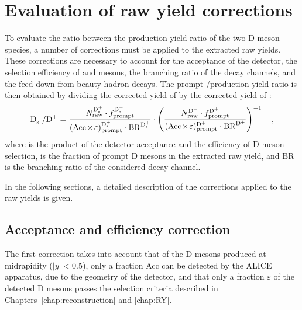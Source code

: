 \chapter{Evaluation of raw yield corrections}

To evaluate the ratio between the production yield ratio of the two D-meson species, a number of corrections must be applied to the extracted raw yields. These corrections are necessary to account for the acceptance of the detector, the selection efficiency of \ds and \dpl mesons, the branching ratio of the decay channels, and the feed-down from beauty-hadron decays. The prompt \ds/\dpl production yield ratio is then obtained by dividing the corrected yield of \ds by the corrected yield of \dpl:
\begin{equation}\label{eq:DsDplusRatio}
        \mathrm{D_s^+}/\mathrm{D^+} = \frac{N_\mathrm{raw}^{\mathrm{D_s^+}}\cdot f_\mathrm{prompt}^\mathrm{D_s^+}}{(\mathrm{Acc}\mkern-2mu\times\mkern-2mu\varepsilon)_\mathrm{prompt}^\mathrm{D_s^+} \cdot \mathrm{BR}^\mathrm{D_s^+}} \cdot \left(\frac{N_\mathrm{raw}^{\mathrm{D^+}}\cdot f_\mathrm{prompt}^\mathrm{D^+}}{(\mathrm{Acc}\mkern-2mu\times\mkern-2mu\varepsilon)_\mathrm{prompt}^\mathrm{D^+} \cdot \mathrm{BR}^\mathrm{D^+}}\right)^{-1}\quad ,
\end{equation}
where \aeff is the product of the detector acceptance and the efficiency of D-meson selection, \fp is the fraction of prompt D mesons in the extracted raw yield, and BR is the branching ratio of the considered decay channel. 

In the following sections, a detailed description of the corrections applied to the raw yields is given.

\section{Acceptance and efficiency correction}\label{sec:aeff}
The first correction takes into account that of the D mesons produced at midrapidity ($\lvert y\rvert < 0.5$), only a fraction Acc can be detected by the ALICE apparatus, due to the geometry of the detector, and that only a fraction $\varepsilon$ of the detected D mesons passes the selection criteria described in Chapters~\ref{chap:reconstruction} and \ref{chap:RY}.

